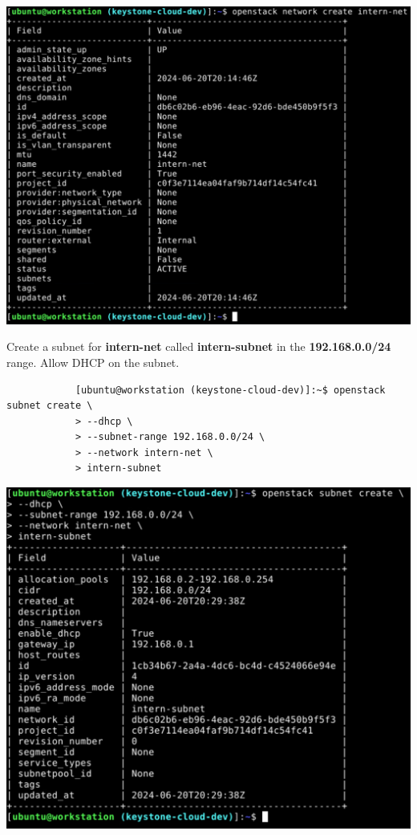 \documentclass[letterpaper, 12pt]{article}
\begin{document}
\begin{enumerate}
\begin{labstep}
        \begin{center}
            \includegraphics[width=\linewidth]{images/part1/step24.png}
        \end{center}
    \end{labstep}

    \begin{labstep}
        Create a subnet for \textbf{intern-net} called \textbf{intern-subnet} in the \textbf{192.168.0.0/24} range.
        Allow DHCP on the subnet.
        \begin{lstlisting}
            [ubuntu@workstation (keystone-cloud-dev)]:~$ openstack subnet create \
            > --dhcp \
            > --subnet-range 192.168.0.0/24 \
            > --network intern-net \
            > intern-subnet
        \end{lstlisting}

        \begin{center}
            \includegraphics[width=\linewidth]{images/part1/step25.png}
        \end{center}
    \end{labstep}


\end{enumerate}
\end{document}
